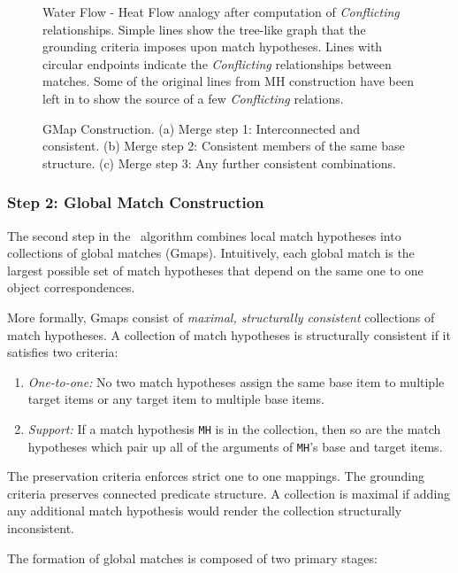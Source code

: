 \begin{figure}
\border
\vspace{3.1in}
\caption[Conflicting relationships.]{Water Flow - Heat Flow analogy after
computation of {\it Conflicting} relationships. Simple lines show the
tree-like graph that the grounding criteria imposes upon match hypotheses.
Lines with circular endpoints indicate the {\it Conflicting} relationships
between matches. Some of the original lines from MH construction have been
left in to show the source of a few {\it Conflicting} relations.}
\label{3D-nogoods}
\border
\vspace{3.1in}
\caption{GMap Construction. (a) Merge step 1: Interconnected and consistent.
(b) Merge step 2: Consistent members of the same base structure. (c) Merge
step 3: Any further consistent combinations.}
\label{fg:wfhf-merging}
\border
\end{figure}


\subsubsection{Step 2: Global Match Construction}

The second step in the \SME\ algorithm combines local match hypotheses into
collections of global matches (Gmaps).  Intuitively, each global match is
the largest possible set of match hypotheses that depend on the same one to
one object correspondences.

More formally, Gmaps consist of {\em maximal, structurally consistent}
collections of match hypotheses.  A collection of match hypotheses is
structurally consistent if it satisfies two criteria:
\begin{enumerate}
\item {\em One-to-one:} No two match hypotheses assign the same
base item to multiple target items or any target item to multiple
base items.
\item {\em Support:} If a match hypothesis {\tt MH} is in the
collection, then so are the match hypotheses which pair up all of
the arguments of {\tt MH}'s base and target items.
\end{enumerate}
The preservation criteria enforces strict one to one mappings.  The
grounding criteria preserves connected predicate structure.  A collection is
maximal if adding any additional match hypothesis would render the collection
structurally inconsistent.

The formation of global matches is composed of two primary stages:

